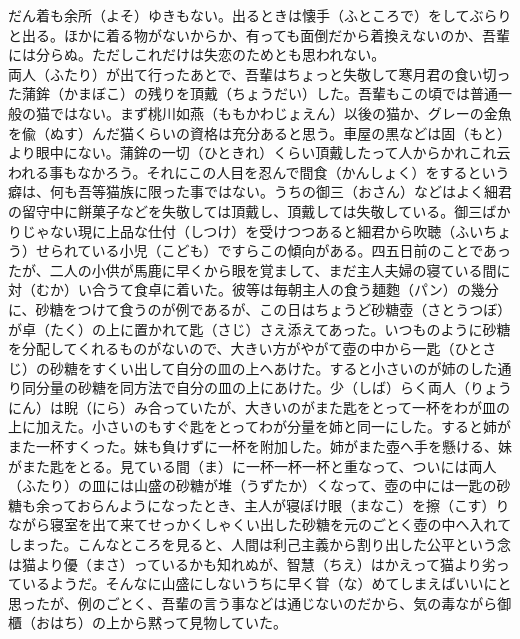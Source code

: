 \documentclass{book}
\begin{document}
だん着も余所（よそ）ゆきもない。出るときは懐手（ふところで）をしてぶらりと出る。ほかに着る物がないからか、有っても面倒だから着換えないのか、吾輩には分らぬ。ただしこれだけは失恋のためとも思われない。\\
両人（ふたり）が出て行ったあとで、吾輩はちょっと失敬して寒月君の食い切った蒲鉾（かまぼこ）の残りを頂戴（ちょうだい）した。吾輩もこの頃では普通一般の猫ではない。まず桃川如燕（ももかわじょえん）以後の猫か、グレーの金魚を偸（ぬす）んだ猫くらいの資格は充分あると思う。車屋の黒などは固（もと）より眼中にない。蒲鉾の一切（ひときれ）くらい頂戴したって人からかれこれ云われる事もなかろう。それにこの人目を忍んで間食（かんしょく）をするという癖は、何も吾等猫族に限った事ではない。うちの御三（おさん）などはよく細君の留守中に餅菓子などを失敬しては頂戴し、頂戴しては失敬している。御三ばかりじゃない現に上品な仕付（しつけ）を受けつつあると細君から吹聴（ふいちょう）せられている小児（こども）ですらこの傾向がある。四五日前のことであったが、二人の小供が馬鹿に早くから眼を覚まして、まだ主人夫婦の寝ている間に対（むか）い合うて食卓に着いた。彼等は毎朝主人の食う麺麭（パン）の幾分に、砂糖をつけて食うのが例であるが、この日はちょうど砂糖壺（さとうつぼ）が卓（たく）の上に置かれて匙（さじ）さえ添えてあった。いつものように砂糖を分配してくれるものがないので、大きい方がやがて壺の中から一匙（ひとさじ）の砂糖をすくい出して自分の皿の上へあけた。すると小さいのが姉のした通り同分量の砂糖を同方法で自分の皿の上にあけた。少（しば）らく両人（りょうにん）は睨（にら）み合っていたが、大きいのがまた匙をとって一杯をわが皿の上に加えた。小さいのもすぐ匙をとってわが分量を姉と同一にした。すると姉がまた一杯すくった。妹も負けずに一杯を附加した。姉がまた壺へ手を懸ける、妹がまた匙をとる。見ている間（ま）に一杯一杯一杯と重なって、ついには両人（ふたり）の皿には山盛の砂糖が堆（うずたか）くなって、壺の中には一匙の砂糖も余っておらんようになったとき、主人が寝ぼけ眼（まなこ）を擦（こす）りながら寝室を出て来てせっかくしゃくい出した砂糖を元のごとく壺の中へ入れてしまった。こんなところを見ると、人間は利己主義から割り出した公平という念は猫より優（まさ）っているかも知れぬが、智慧（ちえ）はかえって猫より劣っているようだ。そんなに山盛にしないうちに早く甞（な）めてしまえばいいにと思ったが、例のごとく、吾輩の言う事などは通じないのだから、気の毒ながら御櫃（おはち）の上から黙って見物していた。\\
\end{document}
